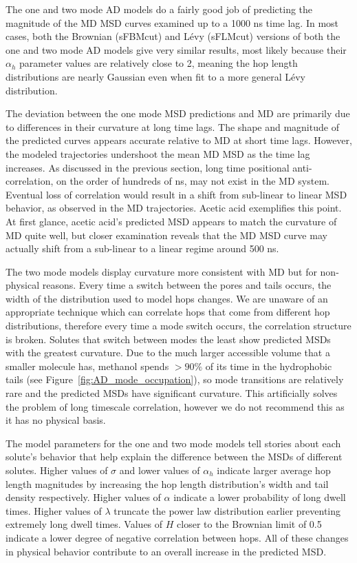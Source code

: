 \documentclass[aps,pre,preprint,groupedaddress,longbibliography]{revtex4-2}
\begin{document}
  The one and two mode AD models do a fairly good job of predicting the
  magnitude of the MD MSD curves examined up to a 1000 ns time lag. In most
  cases, both the Brownian (sFBMcut) and L\'evy (sFLMcut) versions of both the
  one and two mode AD models give very similar results, most likely because
  their $\alpha_h$ parameter values are relatively close to 2, meaning the hop
  length distributions are nearly Gaussian even when fit to a more general
  L\'evy distribution. 
  
  The deviation between the one mode MSD predictions and MD are primarily due
  to differences in their curvature at long time lags. The shape and magnitude
  of the predicted curves appears accurate relative to MD at short time lags.
  However, the modeled trajectories undershoot the mean MD MSD as the time lag
  increases. As discussed in the previous section, long time positional
  anti-correlation, on the order of hundreds of ns, may not exist in the MD
  system. Eventual loss of correlation would result in a shift from sub-linear
  to linear MSD behavior, as observed in the MD trajectories. Acetic acid
  exemplifies this point. At first glance, acetic acid's predicted MSD appears
  to match the curvature of MD quite well, but closer examination reveals that
  the MD MSD curve may actually shift from a sub-linear to a linear regime around
  500 ns.
  
  The two mode models display curvature more consistent with MD but for
  non-physical reasons. Every time a switch between the pores and tails occurs,
  the width of the distribution used to model hops changes. We are unaware of
  an appropriate technique which can correlate hops that come from different
  hop distributions, therefore every time a mode switch occurs, the correlation
  structure is broken. Solutes that switch between modes the least show
  predicted MSDs with the greatest curvature. Due to the much larger
  accessible volume that a smaller molecule has, methanol spends $>90\%$ of its
  time in the hydrophobic tails (see Figure~\ref{fig:AD_mode_occupation}), so
  mode transitions are relatively rare and the predicted MSDs have significant
  curvature. This artificially solves the problem of long timescale
  correlation, however we do not recommend this as it has no physical basis.
  
  The model parameters for the one and two mode models tell stories about each
  solute's behavior that help explain the difference between the MSDs of
  different solutes. Higher values of $\sigma$ and lower values of $\alpha_h$
  indicate larger average hop length magnitudes by increasing the hop length
  distribution's width and tail density respectively. Higher values of $\alpha$
  indicate a lower probability of long dwell times. Higher values of $\lambda$
  truncate the power law distribution earlier preventing extremely long dwell
  times. Values of $H$ closer to the Brownian limit of 0.5 indicate a lower
  degree of negative correlation between hops. All of these changes in physical
  behavior contribute to an overall increase in the predicted MSD.
\end{document}
